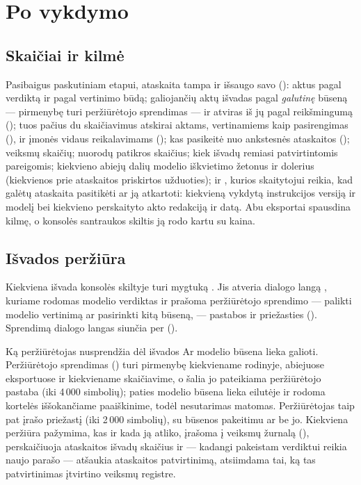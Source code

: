 \section{Po vykdymo}\label{sec:report:after}

\subsection{Skaičiai ir kilmė}

Pasibaigus paskutiniam etapui, ataskaita tampa  ir išsaugo savo 
(): aktus pagal verdiktą ir pagal vertinimo būdą; galiojančių aktų išvadas
pagal \emph{galutinę} būseną --- pirmenybę turi peržiūrėtojo sprendimas --- ir atviras iš jų
pagal reikšmingumą (); tuos pačius du skaičiavimus atskirai aktams,
vertinamiems kaip pasirengimas (), ir įmonės vidaus reikalavimams
(); kas pasikeitė nuo ankstesnės ataskaitos (); veiksmų skaičių;
nuorodų patikros skaičius; kiek išvadų remiasi patvirtintomis pareigomis; kiekvieno abiejų dalių
modelio iškvietimo žetonus ir dolerius (kiekvienos prie ataskaitos priskirtos užduoties); ir
, kurios skaitytojui reikia, kad galėtų ataskaita pasitikėti ar ją atkartoti:
kiekvieną vykdytą instrukcijos versiją ir modelį bei kiekvieno perskaityto akto redakciją ir
datą. Abu eksportai spausdina kilmę, o konsolės santraukos skiltis ją rodo kartu su kaina.

\subsection{Išvados peržiūra}

Kiekviena išvada konsolės skiltyje  turi mygtuką . Jis atveria
dialogo langą , kuriame rodomas modelio verdiktas ir prašoma peržiūrėtojo
sprendimo --- palikti modelio vertinimą ar pasirinkti kitą būseną, --- pastabos ir priežasties
(). Sprendimą dialogo langas siunčia per
 ().

\begin{humanbox}{Ką peržiūrėtojas nusprendžia dėl išvados}
Ar modelio būsena lieka galioti. Peržiūrėtojo sprendimas () turi
pirmenybę kiekviename rodinyje, abiejuose eksportuose ir kiekviename skaičiavime, o šalia jo
pateikiama peržiūrėtojo pastaba (iki 4\,000 simbolių); paties modelio būsena lieka eilutėje ir
rodoma kortelės iššokančiame paaiškinime, todėl nesutarimas matomas. Peržiūrėtojas taip pat
įrašo priežastį (iki 2\,000 simbolių), su būsenos pakeitimu ar be jo. Kiekviena peržiūra
pažymima, kas ir kada ją atliko, įrašoma į veiksmų žurnalą (),
perskaičiuoja ataskaitos išvadų skaičius ir --- kadangi pakeistam verdiktui reikia naujo parašo
--- atšaukia ataskaitos patvirtinimą, atsiimdama tai, ką tas patvirtinimas įtvirtino veiksmų
registre.
\end{humanbox}

